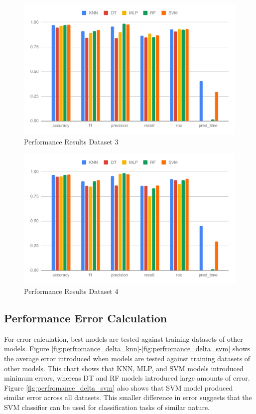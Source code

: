 \begin{figure}[btp]
    \centering
    \includegraphics[width=0.9\columnwidth]{media/results/perf_ds_3.pdf}
    \caption{Performance Results Dataset 3} \label{fig:perfromance_results_dataset_3}
\end{figure}

\begin{figure}[btp]
    \centering
    \includegraphics[width=0.9\columnwidth]{media/results/perf_ds_4.pdf}
    \caption{Performance Results Dataset 4} \label{fig:perfromance_results_dataset_4}
\end{figure}

\subsection{Performance Error Calculation}
For error calculation, best models are tested against training datasets of other models. Figure \ref{fig:perfromance_delta_knn}-\ref{fig:perfromance_delta_svm} shows the average error introduced when models are tested against training datasets of other models. This chart shows that KNN, MLP, and SVM models introduced minimum errors, whereas DT and RF models introduced large amounts of error. Figure \ref{fig:perfromance_delta_svm} also shows that SVM model produced similar error across all datasets. This smaller difference in error suggests that the SVM classifier can be used for classification tasks of similar nature.

